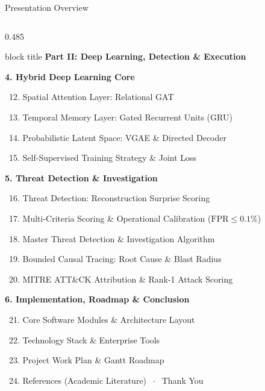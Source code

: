 \documentclass[aspectratio=169,10pt]{beamer}
\begin{document}
\begin{frame}{Presentation Overview}
\begin{columns}[T]
\begin{column}{0.485\textwidth}
\begin{beamercolorbox}[rounded=true,shadow=false,sep=0.25em,wd=\textwidth]{block title}
\textbf{\scriptsize Part II: Deep Learning, Detection \& Execution}
\end{beamercolorbox}
\vspace{0.15em}
{\fontsize{6.2pt}{8.4pt}\selectfont
\textbf{\textcolor{prismNavy}{4. Hybrid Deep Learning Core}}\par\vspace{0.05em}
\textbullet~12. Spatial Attention Layer: Relational GAT\par
\textbullet~13. Temporal Memory Layer: Gated Recurrent Units (GRU)\par
\textbullet~14. Probabilistic Latent Space: VGAE \& Directed Decoder\par
\textbullet~15. Self-Supervised Training Strategy \& Joint Loss\par\vspace{0.30em}
\textbf{\textcolor{prismNavy}{5. Threat Detection \& Investigation}}\par\vspace{0.05em}
\textbullet~16. Threat Detection: Reconstruction Surprise Scoring\par
\textbullet~17. Multi-Criteria Scoring \& Operational Calibration ($\text{FPR}\le 0.1\%$)\par
\textbullet~18. Master Threat Detection \& Investigation Algorithm\par
\textbullet~19. Bounded Causal Tracing: Root Cause \& Blast Radius\par
\textbullet~20. MITRE ATT\&CK Attribution \& Rank-1 Attack Scoring\par\vspace{0.30em}
\textbf{\textcolor{prismNavy}{6. Implementation, Roadmap \& Conclusion}}\par\vspace{0.05em}
\textbullet~21. Core Software Modules \& Architecture Layout\par
\textbullet~22. Technology Stack \& Enterprise Tools\par
\textbullet~23. Project Work Plan \& Gantt Roadmap\par
\textbullet~24. References (Academic Literature) $\;\cdot\;$ Thank You
}
\end{column}
\end{columns}
\end{frame}

\end{document}

